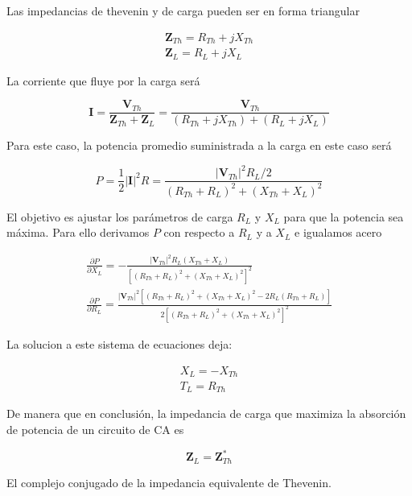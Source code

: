 Las impedancias de thevenin y de carga pueden ser en forma triangular

\begin{eqnarray*}
\mathbf{Z}_{Th} = R_{Th} + j X_{Th} \\
\mathbf{Z}_{L} = R_{L} + j X_{L}
\end{eqnarray*}

La corriente que fluye por la carga será

\begin{equation*}
\mathbf{I} = \frac{\mathbf{V}_{Th}}{\mathbf{Z}_{Th} + \mathbf{Z}_L} = \frac{\mathbf{V}_{Th}}{ (R_{Th} + j X_{Th}) + (R_L + jX_L) }
\end{equation*}

Para este caso, la potencia promedio suministrada a la carga en este caso será

\begin{equation*}
P = \frac{1}{2}|\mathbf{I}|^2 R = \frac{|\mathbf{V}_{Th}|^2R_L/2}{(R_{Th} + R_L )^2 + (X_{Th} + X_L)^2}
\end{equation*}

El objetivo es ajustar los parámetros de carga $R_L$ y $X_L$ para que la potencia sea máxima. Para ello derivamos $P$ con respecto a $R_L$ y a $X_L$ e igualamos acero

\begin{eqnarray*}
\frac{\partial P }{\partial  X_L} = -\frac{|\mathbf{V}_{Th}|^2 R_L (X_{Th} + X_L)}{\left[ (R_{Th} + R_L)^2 + (X_{Th} + X_L)^2\right]^2} \\
\frac{\partial P }{\partial  R_L} = \frac{|\mathbf{V}_{Th}|^2 \left[(R_{Th} + R_L)^2 + (X_{Th} + X_L)^2 - 2R_L(R_{Th} + R_L)   \right]}{2 \left[ (R_{Th} + R_L)^2 + (X_{Th} + X_L)^2\right]^2}
\end{eqnarray*}


La solucion a este sistema de ecuaciones deja:

\begin{eqnarray*}
X_L = -X_{Th} \\
T_L = R_{Th}
\end{eqnarray*}

De manera que en conclusión, la impedancia de carga que maximiza la absorción de potencia de un circuito de CA es 

\begin{equation*}
\mathbf{Z}_L = \mathbf{Z}_{Th}^{*}
\end{equation*}

El complejo conjugado de la impedancia equivalente de Thevenin.

